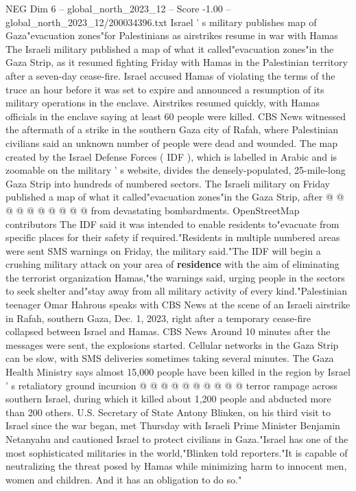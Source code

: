 \begin{textsample}{NEG Dim 6 – global\_north\_2023\_12 – Score -1.00 – global\_north\_2023\_12/200034396.txt}  \label{ex:f6_neg_321}
Israel ' s military publishes map of Gaza"evacuation zones"for Palestinians as airstrikes resume in war with Hamas The Israeli military published a map of what it called"evacuation zones"in the Gaza Strip, as it resumed fighting Friday with Hamas in the Palestinian territory after a seven-day cease-fire.
Israel accused Hamas of violating the terms of the truce an hour before it was set to expire and announced a resumption of its military operations in the enclave.
Airstrikes resumed quickly, with Hamas officials in the enclave saying at least 60 people were killed.
CBS News witnessed the aftermath of a strike in the southern Gaza city of Rafah, where Palestinian civilians said an unknown number of people were dead and wounded.
The map created by the Israel Defense Forces ( IDF ), which is labelled in Arabic and is zoomable on the military ' s website, divides the densely-populated, 25-mile-long Gaza Strip into hundreds of numbered sectors.
The Israeli military on Friday published a map of what it called"evacuation zones"in the Gaza Strip, after @ @ @ @ @ @ @ @ @ @ from devastating bombardments.
OpenStreetMap contributors The IDF said it was intended to enable residents to"evacuate from specific places for their safety if required."Residents in multiple numbered areas were sent SMS warnings on Friday, the military said."The IDF will begin a crushing military attack on your area of \textbf{residence} with the aim of eliminating the terrorist organization Hamas,"the warnings said, urging people in the sectors to seek shelter and"stay away from all military activity of every kind."Palestinian teenager Omar Hahrous speaks with CBS News at the scene of an Israeli airstrike in Rafah, southern Gaza, Dec. 1, 2023, right after a temporary cease-fire collapsed between Israel and Hamas.
CBS News Around 10 minutes after the messages were sent, the explosions started.
Cellular networks in the Gaza Strip can be slow, with SMS deliveries sometimes taking several minutes.
The Gaza Health Ministry says almost 15,000 people have been killed in the region by Israel ' s retaliatory ground incursion @ @ @ @ @ @ @ @ @ @ terror rampage across southern Israel, during which it killed about 1,200 people and abducted more than 200 others.
U.S.
Secretary of State Antony Blinken, on his third visit to Israel since the war began, met Thursday with Israeli Prime Minister Benjamin Netanyahu and cautioned Israel to protect civilians in Gaza."Israel has one of the most sophisticated militaries in the world,"Blinken told reporters."It is capable of neutralizing the threat posed by Hamas while minimizing harm to innocent men, women and children.
And it has an obligation to do so."

\end{textsample}
